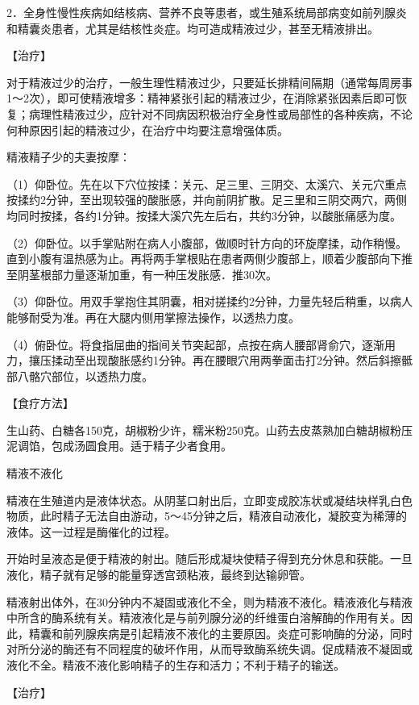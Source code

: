 \documentclass[12pt,UTF8,openany]{ctexbook}
\begin{document}
2．全身性慢性疾病如结核病、营养不良等患者，或生殖系统局部病变如前列腺炎和精囊炎患者，尤其是结核性炎症。均可造成精液过少，甚至无精液排出。

【治疗】

对于精液过少的治疗，一般生理性精液过少，只要延长排精间隔期（通常每周房事1～2次），即可使精液增多：精神紧张引起的精液过少，在消除紧张因素后即可恢复；病理性精液过少，应针对不同病因积极治疗全身性或局部性的各种疾病，不论何种原因引起的精液过少，在治疗中均要注意增强体质。

精液精子少的夫妻按摩：

（1）仰卧位。先在以下穴位按揉：关元、足三里、三阴交、太溪穴、关元穴重点按揉约2分钟，至出现较强的酸胀感，并向前阴扩散。足三里和三阴交两穴，两侧均同时按揉，各约1分钟。按揉大溪穴先左后右，共约3分钟，以酸胀痛感为度。

（2）仰卧位。以手掌贴附在病人小腹部，做顺时针方向的环旋摩揉，动作稍慢。直到小腹有温热感为止。再将两手掌根贴在患者两侧少腹部上，顺着少腹部向下推至阴茎根部力量逐渐加重，有一种压发胀感．推30次。

（3）仰卧位。用双手掌抱住其阴囊，相对搓揉约2分钟，力量先轻后稍重，以病人能够耐受为准。再在大腿内侧用掌擦法操作，以透热力度。

（4）俯卧位。将食指屈曲的指间关节突起部，点按在病人腰部肾俞穴，逐渐用力，攘压揉动至出现酸胀感约1分钟。再在腰眼穴用两拳面击打2分钟。然后斜擦骶部八骼穴部位，以透热力度。

【食疗方法】

生山药、白糖各150克，胡椒粉少许，糯米粉250克。山药去皮蒸熟加白糖胡椒粉压泥调馅，包成汤圆食用。适于精子少者食用。





精液不液化


精液在生殖道内是液体状态。从阴茎口射出后，立即变成胶冻状或凝结块样乳白色物质，此时精子无法自由游动，5～45分钟之后，精液自动液化，凝胶变为稀薄的液体。这一过程是酶催化的过程。

开始时呈液态是便于精液的射出。随后形成凝块使精子得到充分休息和获能。一旦液化，精子就有足够的能量穿透宫颈粘液，最终到达输卵管。

精液射出体外，在30分钟内不凝固或液化不全，则为精液不液化。精液液化与精液中所含的酶系统有关。精液液化是与前列腺分泌的纤维蛋白溶解酶的作用有关。因此，精囊和前列腺疾病是引起精液不液化的主要原因。炎症可影响酶的分泌，同时对所分泌的酶还有不同程度的破坏作用，从而导致酶系统失调。促成精液不凝固或液化不全。精液不液化影响精子的生存和活力；不利于精子的输送。

【治疗】
\end{document}
